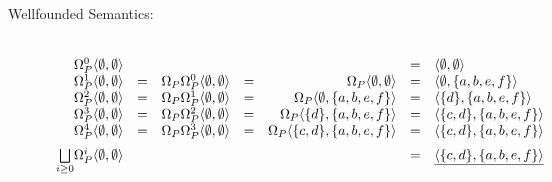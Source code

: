 \begin{Loesung}
\begin{UList}
\begin{description}
\item[Wellfounded Semantics:] ~\\
  \(
  \begin{array}[t]{rcrcrcl}
    \Omega^0_P\langle \emptyset,\emptyset\rangle & & & & & = &
    \langle\emptyset,\emptyset\rangle \\
    \Omega^1_P\langle \emptyset,\emptyset\rangle & = & 
    \Omega_P\Omega^0_P\langle \emptyset,\emptyset\rangle & = &
    \Omega_P\langle \emptyset,\emptyset\rangle & = & 
    \langle\emptyset,\{a,b,e,f\}\rangle \\
    \Omega^2_P\langle \emptyset,\emptyset\rangle & = & 
    \Omega_P\Omega^1_P\langle \emptyset,\emptyset\rangle & = &
    \Omega_P\langle \emptyset,\{a,b,e,f\}\rangle & = & 
    \langle\{d\},\{a,b,e,f\}\rangle \\
    \Omega^3_P\langle \emptyset,\emptyset\rangle & = & 
    \Omega_P\Omega^2_P\langle \emptyset,\emptyset\rangle & = &
    \Omega_P\langle \{d\},\{a,b,e,f\}\rangle & = & 
    \langle\{c,d\},\{a,b,e,f\}\rangle \\
    \Omega^4_P\langle \emptyset,\emptyset\rangle & = & 
    \Omega_P\Omega^3_P\langle \emptyset,\emptyset\rangle & = &
    \Omega_P\langle \{c,d\},\{a,b,e,f\}\rangle & = & 
    \langle\{c,d\},\{a,b,e,f\}\rangle \\[2mm]
    \underset{i\geq 0}{\bigsqcup}\Omega^i_P\langle \emptyset,\emptyset\rangle 
    & & & & & = & \underline{\langle\{c,d\},\{a,b,e,f\}\rangle}
  \end{array}
  \)
%
%
\end{description}\newpage
%
\item
\begin{description}


\end{description}
\end{UList}
\end{Loesung}
